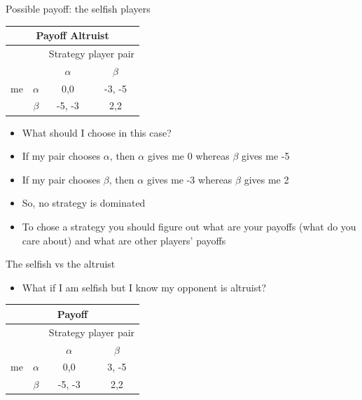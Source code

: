 \documentclass{beamer}
\begin{document}
\begin{frame}{Possible payoff: the selfish players}
\begin{center}
  \begin{tabular}{|c|c|c|c|}
    \hline
    \multicolumn{4}{|c|}{Payoff Altruist}\\
    \hline
 &
&
\multicolumn{2}{|c|}{Strategy player pair}\\
    \hline
 & 
     & $\alpha$ & $\beta$  \\
    \hline
me & $\alpha$
     & 0,0 & -3, -5 \\
    \hline
 & $\beta$
     & -5, -3 & 2,2 \\
    \hline
  \end{tabular}
\end{center}
  \begin{itemize}
  \item What should I choose in this case?
  \item<2-> If my pair chooses $\alpha$, then $\alpha$ gives me 0
    whereas $\beta$ gives me -5
  \item<3-> If my pair chooses $\beta$, then $\alpha$ gives me -3
    whereas $\beta$ gives me 2
  \item<4-> So, no strategy is dominated
  \item<5> To chose a strategy you should figure 
    out what are your payoffs (what do you care about)
    and what are other players' payoffs
  \end{itemize}
\end{frame}



\begin{frame}{The selfish vs the altruist}
  \begin{itemize}
  \item What if I am selfish but I know my opponent
    is altruist?
  \end{itemize}

\begin{center}
  \begin{tabular}{|c|c|c|c|}
    \hline
    \multicolumn{4}{|c|}{Payoff}\\
    \hline
 &
&
\multicolumn{2}{|c|}{Strategy player pair}\\
    \hline
 & 
     & $\alpha$ & $\beta$  \\
    \hline
me & $\alpha$
     & 0,0 & 3, -5 \\
    \hline
 & $\beta$
     & -5, -3 & 2,2 \\
    \hline
  \end{tabular}
\end{center}

\end{frame}
\end{document}
